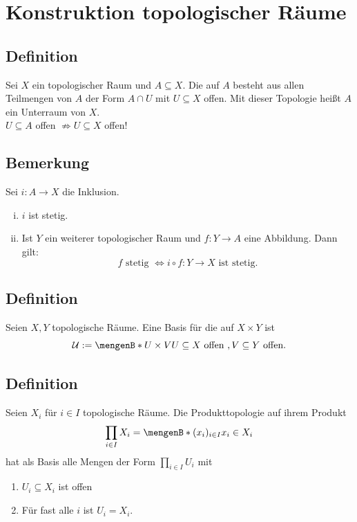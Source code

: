 \section{Konstruktion topologischer Räume} %
\label{sec:2}

\subsection[Definition: Spurtopologie]{Definition} %
\label{sub:21}
Sei $X$ ein topologischer Raum und $A \subseteq X$. Die  auf $A$ besteht aus allen Teilmengen von $A$ der Form $A \cap U$ mit 
$U \subseteq X$ offen. Mit dieser Topologie heißt $A$ ein Unterraum von $X$. \\
 $U \subseteq A$ offen $\not\Rightarrow 	U \subseteq X$ offen!

\subsection[Bemerkung: Stetigkeit durch Verknüpfung mit Inklusion]{Bemerkung} %
\label{sub:22}
Sei $i : A \to X$ die Inklusion.
\begin{enumerate}[(i)]
	\item $i$ ist stetig.
	\item Ist $Y$ ein weiterer topologischer Raum und $f : Y \to A$ eine Abbildung. Dann gilt:
	\[
		f \text{ stetig } \iff i \circ  f : Y \to X \text{ ist stetig.}
	\]
\end{enumerate}

\subsection[Definition: Produkttopologie bei 2 Faktoren]{Definition} %
\label{sub:23}
Seien $X,Y$ topologische Räume. Eine Basis für die  auf $X \times Y$ ist 
\[
	\mathcal{U} := \set[U \times V]{U \subseteq X \text{ offen }, V \subseteq Y \text{ offen}}. 
\]

\subsection[Definition: Produkttopologie bei unendlichen vielen Faktoren]{Definition} %
\label{sub:24}
Seien $X_i$ für $i \in I$ topologische Räume. Die Produkttopologie auf ihrem Produkt 
\[
	\prod_{i \in I} X_i = \set[(x_i)_{i \in I}]{x_i \in X_i} 
\]
hat als Basis alle Mengen der Form $\prod_{i \in I} U_i$ mit
\begin{enumerate}[1)]
	\item $U_i \subseteq X_i$ ist offen
	\item Für fast alle $i$ ist $U_i = X_i$.
\end{enumerate}

